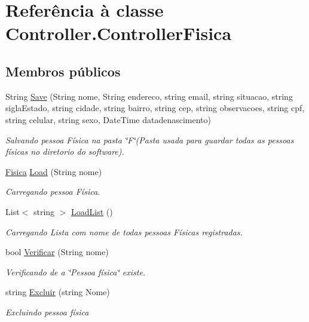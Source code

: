 \hypertarget{class_controller_1_1_controller_fisica}{}\section{Referência à classe Controller.\+Controller\+Fisica}
\label{class_controller_1_1_controller_fisica}
\subsection*{Membros públicos}
\begin{DoxyCompactItemize}
\item 
String \hyperlink{class_controller_1_1_controller_fisica_a282fa6081a1f5bf17d92204d27ad45f1}{Save} (String nome, String endereco, string email, string situacao, string sigla\+Estado, string cidade, string bairro, string cep, string observacoes, string cpf, string celular, string sexo, Date\+Time datadenascimento)
\begin{DoxyCompactList}\small\item\em Salvando pessoa Física na pasta \char`\"{}\+F\char`\"{}(Pasta usada para guardar todas as pessoas físicas no diretorio do software). \end{DoxyCompactList}\item 
\hyperlink{class_model_1_1_pessoa__e___usuario_1_1_fisica}{Fisica} \hyperlink{class_controller_1_1_controller_fisica_ad1d2cd41524894a04f66f21d6a8f6133}{Load} (String nome)
\begin{DoxyCompactList}\small\item\em Carregando pessoa Física. \end{DoxyCompactList}\item 
List$<$ string $>$ \hyperlink{class_controller_1_1_controller_fisica_abb42ed5e7ed4d9af0bd0d71d62969af1}{Load\+List} ()
\begin{DoxyCompactList}\small\item\em Carregando Lista com nome de todas pessoas Físicas registradas. \end{DoxyCompactList}\item 
bool \hyperlink{class_controller_1_1_controller_fisica_a36208bbeec89cd954c7eb44708b1cec7}{Verificar} (String nome)
\begin{DoxyCompactList}\small\item\em Verificando de a \char`\"{}\+Pessoa física\char`\"{} existe. \end{DoxyCompactList}\item 
string \hyperlink{class_controller_1_1_controller_fisica_a2b667e641dc776b269132ea919234e04}{Excluir} (string Nome)
\begin{DoxyCompactList}\small\item\em Excluindo pessoa física \end{DoxyCompactList}\end{DoxyCompactItemize}


